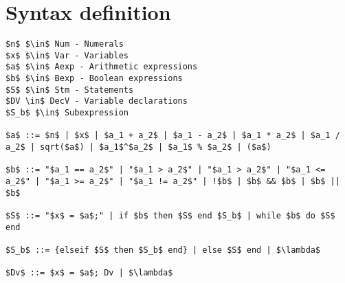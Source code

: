 \section{Syntax definition}\label{sec::anlysis::syntax-definition}
\begin{lstlisting}[mathescape, captionpos=b, caption={Syntax formation rules}]
$n$ $\in$ Num - Numerals
$x$ $\in$ Var - Variables
$a$ $\in$ Aexp - Arithmetic expressions
$b$ $\in$ Bexp - Boolean expressions
$S$ $\in$ Stm - Statements
$DV \in$ DecV - Variable declarations
$S_b$ $\in$ Subexpression

$a$ ::= $n$ | $x$ | $a_1 + a_2$ | $a_1 - a_2$ | $a_1 * a_2$ | $a_1 / a_2$ | sqrt($a$) | $a_1$^$a_2$ | $a_1$ % $a_2$ | ($a$)

$b$ ::= "$a_1 == a_2$" | "$a_1 > a_2$" | "$a_1 > a_2$" | "$a_1 <= a_2$" | "$a_1 >= a_2$" | "$a_1 != a_2$" | !$b$ | $b$ && $b$ | $b$ || $b$

$S$ ::= "$x$ = $a$;" | if $b$ then $S$ end $S_b$ | while $b$ do $S$ end

$S_b$ ::= {elseif $S$ then $S_b$ end} | else $S$ end | $\lambda$

$Dv$ ::= $x$ = $a$; Dv | $\lambda$
\end{lstlisting}



